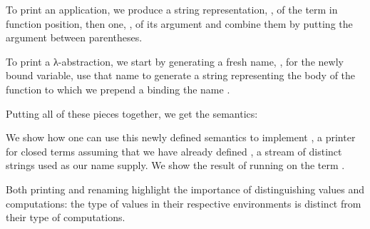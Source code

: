 To print an application, we produce a string representation, , of the term in
function position, then one, , of its argument and combine them by putting the
argument between parentheses.

\begin{agdasnippet}
\end{agdasnippet}

To print a λ-abstraction, we start by generating a fresh name, , for the
newly bound variable, use that name to generate a string  representing the
body of the function to which we prepend a  binding the name .

\begin{agdasnippet}
\end{agdasnippet}

Putting all of these pieces together, we get the  semantics:

\begin{agdasnippet}
\end{agdasnippet}

We show how one can use this newly defined semantics to implement ,
a printer for closed terms assuming that we have already defined ,
a stream of distinct strings used as our name supply. We show the result of
running  on the term .

\begin{agdasnippet}
\end{agdasnippet}


Both printing and renaming highlight the importance of distinguishing
values and computations: the type of values in their respective
environments is distinct from their type of computations.

